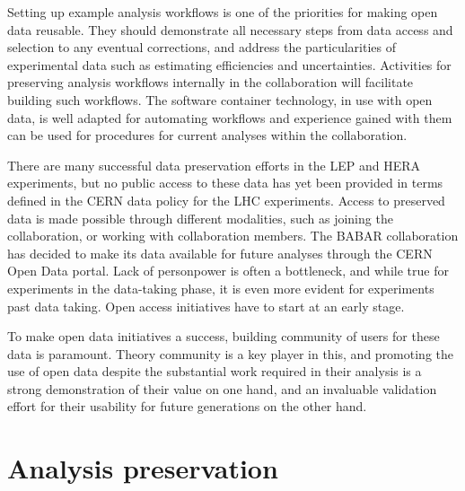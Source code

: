 \documentclass[11pt]{article}
\begin{document}
Setting up example analysis workflows is one of the priorities for making open data reusable. They should demonstrate all necessary steps from data access and selection to any eventual corrections, and address the particularities of experimental data such as estimating efficiencies and uncertainties. Activities for preserving analysis workflows internally in the collaboration will facilitate building such workflows. The software container technology, in use with open data, is well adapted for automating workflows and experience gained with them can be used for procedures for current analyses within the collaboration.


There are many successful data preservation efforts in the LEP and HERA experiments, but no public access to these data has yet been provided in terms defined in the CERN data policy for the LHC experiments. Access to preserved data is made possible through different modalities, such as joining the collaboration, or working with collaboration members. The BABAR collaboration has decided to make its data available for future analyses through the CERN Open Data portal. Lack of personpower is often a bottleneck, and while true for experiments in the data-taking phase, it is even more evident for experiments past data taking. Open access initiatives have to start at an early stage.


To make open data initiatives a success, building community of users for these data is paramount. Theory community is a key player in this, and promoting the use of open data despite the substantial work required in their analysis is a strong demonstration of their value on one hand, and an invaluable validation effort for their usability for future generations on the other hand.

\section{Analysis preservation}
\end{document}
